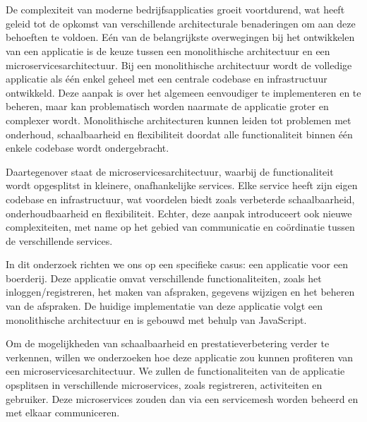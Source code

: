 
\chapter{}%
\label{ch:inleiding}

\section{}%
\label{sec:probleemstelling}

De complexiteit van moderne bedrijfsapplicaties groeit voortdurend, wat heeft geleid tot de opkomst van verschillende architecturale benaderingen om aan deze behoeften te voldoen. Eén van de belangrijkste overwegingen bij het ontwikkelen van een applicatie is de keuze tussen een monolithische architectuur en een microservicesarchitectuur. Bij een monolithische architectuur wordt de volledige applicatie als één enkel geheel met een centrale codebase en infrastructuur ontwikkeld. Deze aanpak is over het algemeen eenvoudiger te implementeren en te beheren, maar kan problematisch worden naarmate de applicatie groter en complexer wordt. Monolithische architecturen kunnen leiden tot problemen met onderhoud, schaalbaarheid en flexibiliteit doordat alle functionaliteit binnen één enkele codebase wordt ondergebracht.


Daartegenover staat de microservicesarchitectuur, waarbij de functionaliteit wordt opgesplitst in kleinere, onafhankelijke services. Elke service heeft zijn eigen codebase en infrastructuur, wat voordelen biedt zoals verbeterde schaalbaarheid, onderhoudbaarheid en flexibiliteit. Echter, deze aanpak introduceert ook nieuwe complexiteiten, met name op het gebied van communicatie en coördinatie tussen de verschillende services.


In dit onderzoek richten we ons op een specifieke casus: een applicatie voor een boerderij. Deze applicatie omvat verschillende functionaliteiten, zoals het inloggen/registreren, het maken van afspraken, gegevens wijzigen en het beheren van de afspraken. De huidige implementatie van deze applicatie volgt een monolithische architectuur en is gebouwd met behulp van JavaScript.


Om de mogelijkheden van schaalbaarheid en prestatieverbetering verder te verkennen, willen we onderzoeken hoe deze applicatie zou kunnen profiteren van een microservicesarchitectuur. We zullen de functionaliteiten van de applicatie opsplitsen in verschillende microservices, zoals registreren, activiteiten en gebruiker. Deze microservices zouden dan via een servicemesh worden beheerd en met elkaar communiceren.


